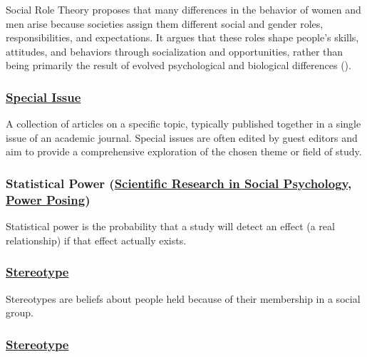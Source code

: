 \documentclass[
  letterpaper,
]{book}
\begin{document}
Social Role Theory proposes that many differences in the behavior of
women and men arise because societies assign them different social and
gender roles, responsibilities, and expectations. It argues that these
roles shape people's skills, attitudes, and behaviors through
socialization and opportunities, rather than being primarily the result
of evolved psychological and biological differences
().

\subsubsection*{\texorpdfstring{\hyperref[def-specialissue]{Special
Issue}}{Special Issue}}\label{special-issue}

A collection of articles on a specific topic, typically published
together in a single issue of an academic journal. Special issues are
often edited by guest editors and aim to provide a comprehensive
exploration of the chosen theme or field of study.

\subsubsection*{\texorpdfstring{Statistical Power
(\hyperref[def-statisticalpower]{Scientific Research in Social
Psychology}, \hyperref[def-statisticalpower]{Power
Posing})}{Statistical Power (Scientific Research in Social Psychology, Power Posing)}}\label{statistical-power-scientific-research-in-social-psychology-power-posing}

Statistical power is the probability that a study will detect an effect
(a real relationship) if that effect actually exists.

\subsubsection*{\texorpdfstring{\hyperref[def-stereotype]{Stereotype}}{Stereotype}}\label{stereotype}

Stereotypes are beliefs about people held because of their membership in
a social group.

\subsubsection*{\texorpdfstring{\hyperref[def-stereotype]{Stereotype}}{Stereotype}}\label{stereotype-1}
\end{document}

